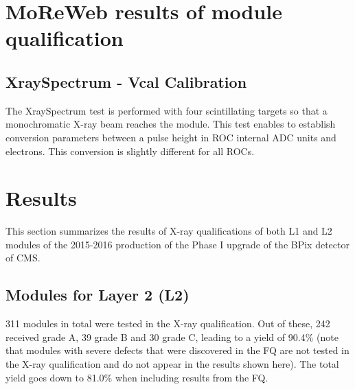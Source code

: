 \documentclass[a4paper,12pt,twoside]{article}
\begin{document}
\section{MoReWeb results of module qualification}

\subsection{XraySpectrum - Vcal Calibration}
The XraySpectrum test is performed with four scintillating targets so that a monochromatic X-ray beam reaches the module. This test enables to establish conversion parameters between a pulse height in ROC internal ADC units and electrons. This conversion is slightly different for all ROCs.

\section{Results}

This section summarizes the results of X-ray qualifications of both L1 and L2 modules of the 2015-2016 production of the Phase I upgrade of the BPix detector of CMS. 

\subsection{Modules for Layer 2 (L2)}
311 modules in total were tested in the X-ray qualification. Out of these, 242 received grade A, 39 grade B and 30 grade C, leading to a yield of 90.4\% (note that modules with severe defects that were discovered in the FQ are not tested in the X-ray qualification and do not appear in the results shown here). The total yield goes down to 81.0\% when including results from the FQ.  
\end{document}
